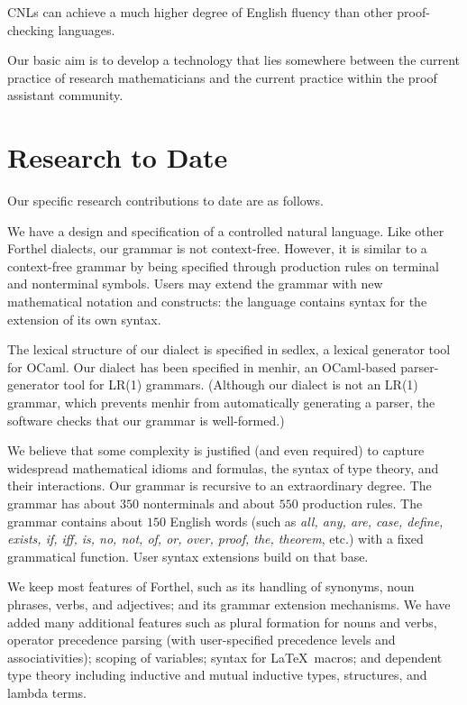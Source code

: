 \documentclass{easychair}
\renewcommand{\~}{\ }
\renewcommand{\_}{\textunderscore}
\begin{document}
CNLs can achieve a much higher degree of English fluency than other
proof-checking languages.  

Our basic aim is to develop a technology that lies somewhere between
the current practice of research mathematicians and the current
practice within the proof assistant community.

\section{Research to Date}

Our specific research contributions to date are as follows.

We have a design and specification of a controlled natural language.
Like other Forthel dialects, our grammar is not context-free.
However, it is similar to a context-free grammar by being specified
through production rules on terminal and nonterminal symbols.  Users
may extend the grammar with new mathematical notation and constructs:
the language contains syntax for the extension of its own syntax.

The lexical structure of our dialect is specified in sedlex, a lexical
generator tool for OCaml.  Our dialect has been specified in menhir,
an OCaml-based parser-generator tool for LR(1) grammars.  (Although
our dialect is not an LR(1) grammar, which prevents menhir from
automatically generating a parser, the software checks that our
grammar is well-formed.)

We believe that some complexity is justified (and even required) to
capture widespread mathematical idioms and formulas, the syntax of
type theory, and their interactions. Our grammar is recursive to an
extraordinary degree.  The grammar has about $350$ nonterminals and
about $550$ production rules.  The grammar contains about $150$
English words (such as \emph{all, any, are, case, define, exists, if,
  iff, is, no, not, of, or, over, proof, the, theorem}, etc.)  with a
fixed grammatical function.  User syntax extensions build on that
base.

We keep most features of Forthel, such as its handling of synonyms,
noun phrases, verbs, and adjectives; and its grammar extension
mechanisms.  We have added many additional features such as plural
formation for nouns and verbs, operator precedence parsing (with
user-specified precedence levels and associativities); scoping of
variables; syntax for \LaTeX\ macros; and dependent type theory
including inductive and mutual inductive types, structures, and lambda
terms.
\end{document}

